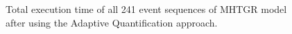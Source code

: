 \begin{figure}[htbp]
  \centering
  
  \caption{Total execution time of all 241 event sequences of MHTGR model after using the Adaptive Quantification approach.}
  \label{fig:adaptive_quantification_pt2}
\end{figure}